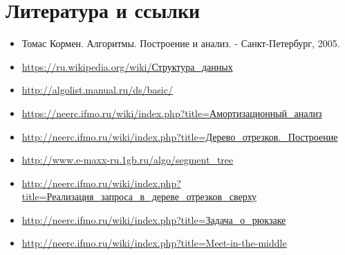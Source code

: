 \section{Литература и ссылки}
\begin{itemize}
    \item[] Томас Кормен. Алгоритмы. Построение и анализ. - Санкт-Петербург, 2005.
    \item[] \url{https://ru.wikipedia.org/wiki/Структура_данных}
    \item[] \url{http://algolist.manual.ru/ds/basic/}
    \item[] \url{https://neerc.ifmo.ru/wiki/index.php?title=Амортизационный_анализ}
    \item[] \url{http://neerc.ifmo.ru/wiki/index.php?title=Дерево_отрезков._Построение}
    \item[] \url{http://www.e-maxx-ru.1gb.ru/algo/segment_tree}
    \item[] \url{http://neerc.ifmo.ru/wiki/index.php?title=Реализация_запроса_в_дереве_отрезков_сверху}
    \item[] \url{http://neerc.ifmo.ru/wiki/index.php?title=Задача_о_рюкзаке}
    \item[] \url{http://neerc.ifmo.ru/wiki/index.php?title=Meet-in-the-middle}
\end{itemize}
